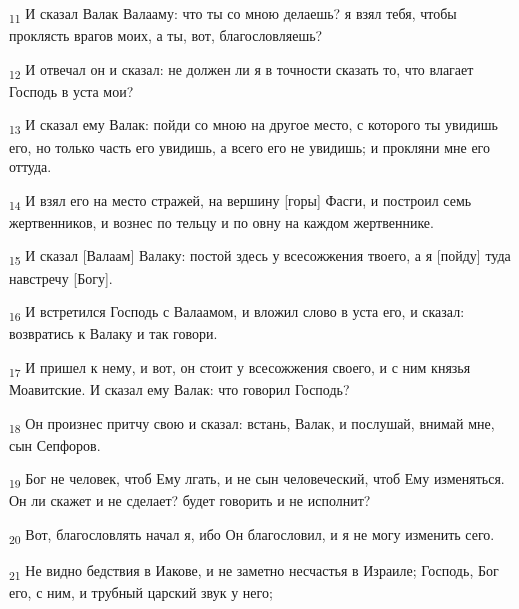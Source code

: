 \begin{tcolorbox}
\textsubscript{11} И сказал Валак Валааму: что ты со мною делаешь? я взял тебя, чтобы проклясть врагов моих, а ты, вот, благословляешь?
\end{tcolorbox}
\begin{tcolorbox}
\textsubscript{12} И отвечал он и сказал: не должен ли я в точности сказать то, что влагает Господь в уста мои?
\end{tcolorbox}
\begin{tcolorbox}
\textsubscript{13} И сказал ему Валак: пойди со мною на другое место, с которого ты увидишь его, но только часть его увидишь, а всего его не увидишь; и прокляни мне его оттуда.
\end{tcolorbox}
\begin{tcolorbox}
\textsubscript{14} И взял его на место стражей, на вершину [горы] Фасги, и построил семь жертвенников, и вознес по тельцу и по овну на каждом жертвеннике.
\end{tcolorbox}
\begin{tcolorbox}
\textsubscript{15} И сказал [Валаам] Валаку: постой здесь у всесожжения твоего, а я [пойду] туда навстречу [Богу].
\end{tcolorbox}
\begin{tcolorbox}
\textsubscript{16} И встретился Господь с Валаамом, и вложил слово в уста его, и сказал: возвратись к Валаку и так говори.
\end{tcolorbox}
\begin{tcolorbox}
\textsubscript{17} И пришел к нему, и вот, он стоит у всесожжения своего, и с ним князья Моавитские. И сказал ему Валак: что говорил Господь?
\end{tcolorbox}
\begin{tcolorbox}
\textsubscript{18} Он произнес притчу свою и сказал: встань, Валак, и послушай, внимай мне, сын Сепфоров.
\end{tcolorbox}
\begin{tcolorbox}
\textsubscript{19} Бог не человек, чтоб Ему лгать, и не сын человеческий, чтоб Ему изменяться. Он ли скажет и не сделает? будет говорить и не исполнит?
\end{tcolorbox}
\begin{tcolorbox}
\textsubscript{20} Вот, благословлять начал я, ибо Он благословил, и я не могу изменить сего.
\end{tcolorbox}
\begin{tcolorbox}
\textsubscript{21} Не видно бедствия в Иакове, и не заметно несчастья в Израиле; Господь, Бог его, с ним, и трубный царский звук у него;
\end{tcolorbox}
